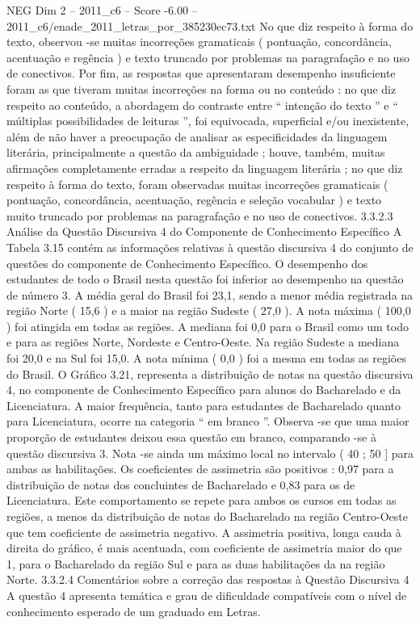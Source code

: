 \begin{textsample}{NEG Dim 2 – 2011\_c6 – Score -6.00 – 2011\_c6/enade\_2011\_letras\_por\_385230ec73.txt}
No que diz respeito à forma do texto, observou -se muitas incorreções gramaticais ( pontuação, concordância, acentuação e regência ) e texto truncado por problemas na paragrafação e no uso de conectivos.
Por fim, as respostas que apresentaram desempenho insuficiente foram as que tiveram muitas incorreções na forma ou no conteúdo : no que diz respeito ao conteúdo, a abordagem do contraste entre “ intenção do texto ” e “ múltiplas possibilidades de leituras ”, foi equivocada, superficial e/ou inexistente, além de não haver a preocupação de analisar as especificidades da linguagem literária, principalmente a questão da ambiguidade ; houve, também, muitas afirmações completamente erradas a respeito da linguagem literária ; no que diz respeito à forma do texto, foram observadas muitas incorreções gramaticais ( pontuação, concordância, acentuação, regência e seleção vocabular ) e texto muito truncado por problemas na paragrafação e no uso de conectivos. 3.3.2.3 Análise da Questão Discursiva 4 do Componente de Conhecimento Específico A Tabela 3.15 contém as informações relativas à questão discursiva 4 do conjunto de questões do componente de Conhecimento Específico.
O desempenho dos estudantes de todo o Brasil nesta questão foi inferior ao desempenho na questão de número 3.
A média geral do Brasil foi 23,1, sendo a menor média registrada na região Norte ( 15,6 ) e a maior na região Sudeste ( 27,0 ).
A nota máxima ( 100,0 ) foi atingida em todas as regiões.
A mediana foi 0,0 para o Brasil como um todo e para as regiões Norte, Nordeste e Centro-Oeste.
Na região Sudeste a mediana foi 20,0 e na Sul foi 15,0.
A nota mínima ( 0,0 ) foi a mesma em todas as regiões do Brasil.
O Gráfico 3.21, representa a distribuição de notas na questão discursiva 4, no componente de Conhecimento Específico para alunos do Bacharelado e da Licenciatura.
A maior frequência, tanto para estudantes de Bacharelado quanto para Licenciatura, ocorre na categoria “ em branco ”.
Observa -se que uma maior proporção de estudantes deixou essa questão em branco, comparando -se à questão discursiva 3.
Nota -se ainda um máximo local no intervalo ( 40 ; 50 ] para ambas as habilitações.
Os coeficientes de assimetria são positivos : 0,97 para a distribuição de notas dos concluintes de Bacharelado e 0,83 para os de Licenciatura.
Este comportamento se repete para ambos os cursos em todas as regiões, a menos da distribuição de notas do Bacharelado na região Centro-Oeste que tem coeficiente de assimetria negativo.
A assimetria positiva, longa cauda à direita do gráfico, é mais acentuada, com coeficiente de assimetria maior do que 1, para o Bacharelado da região Sul e para as duas habilitações da na região Norte. 3.3.2.4 Comentários sobre a correção das respostas à Questão Discursiva 4 A questão 4 apresenta temática e grau de dificuldade compatíveis com o nível de conhecimento esperado de um graduado em Letras.

\end{textsample}

